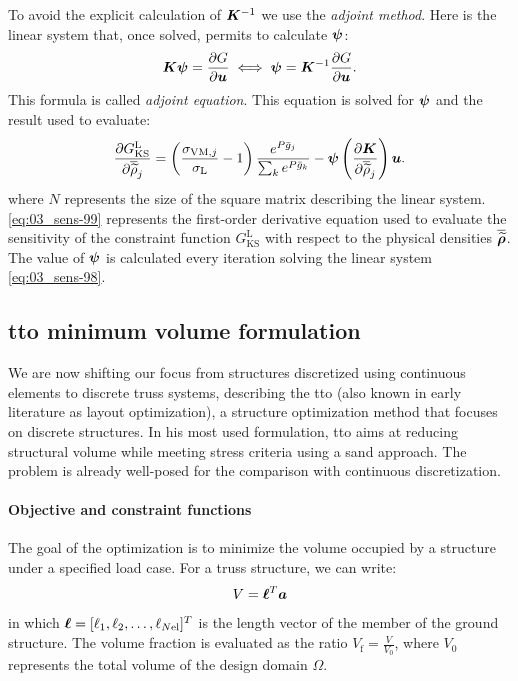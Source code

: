 To avoid the explicit calculation of $\bm{K}^{-1}$ we use the \textit{adjoint method}. Here is the linear system that, once solved, permits to calculate $\bm{\psi}$:
\begin{equation} \label{eq:03_sens-98}
    \bm{K}\bm{\psi} = \frac{\partial G}{\partial\bm{u}} \iff \bm{\psi} = \bm{K}^{-1}\frac{\partial G}{\partial\bm{u}}.
\end{equation}
This formula is called \textit{adjoint equation}. This equation is solved for $\bm{\psi}$ and the result used to evaluate:
\begin{equation}\label{eq:03_sens-99}
\frac{\partial G_{\text{KS}}^\text{L}}{\partial\overline{\widetilde{\rho}}_j} = \left(\frac{ \sigma_{\text{VM},j}}{\sigma_\text{L}}-1 \right) \frac{e^{{P}\bar{g}_j}}{\sum_k e^{{P}\bar{g}_k}} - \bm{\psi} \left(\frac{\partial\bm{K}}{\partial\overline{\widetilde{\rho}}_{j}}\right) \bm{u}.
\end{equation}
 where $N$ represents the size of the square matrix describing the linear system.
\eqref{eq:03_sens-99} represents the first-order derivative equation used to evaluate the sensitivity of the constraint function $G_{\text{KS}}^\text{L}$ with respect to the physical densities $\bm{\overline{\widetilde{\rho}}}$. The value of $\bm{\psi}$ is calculated every iteration solving the linear system \ref{eq:03_sens-98}.

\subsection{\acrfull{tto} minimum volume formulation}
We are now shifting our focus from structures discretized using continuous elements to discrete truss systems, describing the \acrfull{tto} (also known in early literature as layout optimization), a structure optimization method that focuses on discrete structures. In his most used formulation, \gls{tto} aims at reducing structural volume while meeting stress criteria using a \gls{sand} approach. The problem is already well-posed for the comparison with continuous discretization.

\paragraph{Objective and constraint functions} 
The goal of the optimization is to minimize the volume occupied by a structure under a specified load case. For a truss structure, we can write:
\begin{equation}
    V = \bm{\ell}^{T}\bm{a}
\end{equation}
in which $\bm{\ell} = [\ell_1, \ell_2, \ldots,\ell_{N\text{el}}]^T$ is the length vector of the member of the ground structure. The volume fraction is evaluated as the ratio $ V_\text{f} = \frac{V}{V_0}$, where $V_0$ represents the total volume of the design domain $\Omega$.

